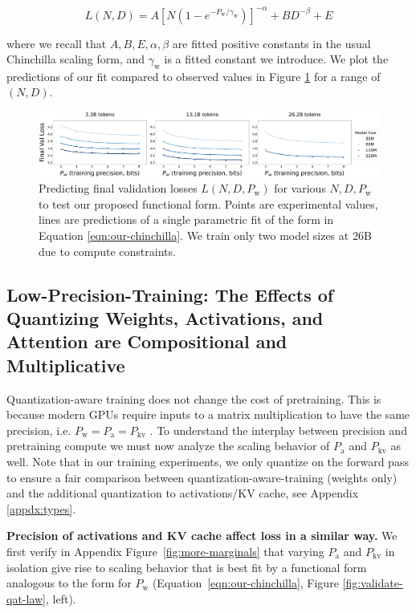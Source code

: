 \documentclass[11pt]{article}
\begin{document}
\begin{equation}
\label{eqn:our-chinchilla}
    L(N, D) = A[N(1-e^{-P_\text{w}/\gamma_\text{w}})]^{-\alpha} + BD^{-\beta} + E
\end{equation}

where we recall that $A, B, E, \alpha, \beta$ are fitted positive constants in the usual Chinchilla scaling form, and $\gamma_\text{w}$ is a fitted constant we introduce.  We plot the predictions of our fit compared to observed values in Figure \ref{fig:pw-fit} for a range of $(N, D)$. 

\begin{figure}[h]
    \centering
    \includegraphics[width=\linewidth]{loss_vs_w_new_evals.pdf} %
    \caption{Predicting final validation losses $L(N, D, P_\text{w})$ for various $N, D, P_\text{w}$ to test our proposed functional form. Points are experimental values, lines are predictions of a single parametric fit of the form in Equation \ref{eqn:our-chinchilla}. We train only two model sizes at 26B due to compute constraints. }
    \label{fig:pw-fit}
\end{figure}

\subsection{Low-Precision-Training: The Effects of Quantizing Weights, Activations, and Attention are Compositional and Multiplicative}

Quantization-aware training does not change the cost of pretraining. This is because modern GPUs require inputs to a matrix multiplication to have the same precision, i.e. $P_\text{w} = P_\text{a}=P_\text{kv}$ \citep{micikevicius2022fp8}. To understand the interplay between precision and pretraining compute we must now analyze the scaling behavior of $P_\text{a}$ and $P_\text{kv}$ as well. Note that in our training experiments, we only quantize on the forward pass to ensure a fair comparison between quantization-aware-training (weights only) and the additional quantization to activations/KV cache, see Appendix \ref{appdx:types}. 

\textbf{Precision of activations and KV cache affect loss in a similar way.} We first verify in Appendix Figure~\ref{fig:more-marginals} that varying $P_\text{a}$ and $P_\text{kv}$ in isolation give rise to scaling behavior that is best fit by a functional form analogous to the form for $P_\text{w}$ (Equation~\ref{eqn:our-chinchilla}, Figure \ref{fig:validate-qat-law}, left).
\end{document}
